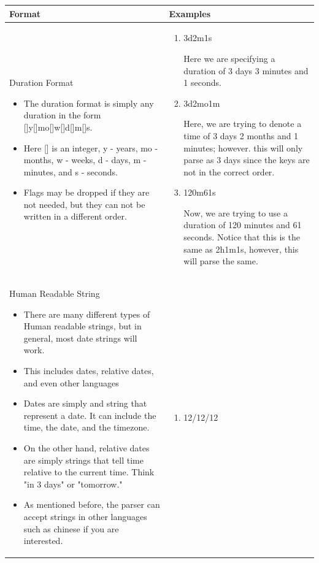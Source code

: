 \documentclass{scrartcl}
\begin{document}
\begin{tabularx}{\textwidth}{|>{\raggedright\arraybackslash}X|>{\raggedright\arraybackslash}X|}
\hline
Format & Examples \\
\hline
Duration Format

\begin{itemize}
    \item The duration format is simply any duration in the form []y[]mo[]w[]d[]m[]s.
    
    \item Here [] is an integer, y - years, mo - months, w - weeks, d - days, m - minutes, and s - seconds.
    
    \item Flags may be dropped if they are not needed, but they can not be written in a different order. 
    
\end{itemize}&
\begin{enumerate}
    \item 3d2m1s
    
    Here we are specifying a duration of 3 days 3 minutes and 1 seconds.
    
    \item 3d2mo1m
    
    Here, we are trying to denote a time of 3 days 2 months and 1 minutes; however. this will only parse as 3 days since the keys are not in the correct order. 
    
    \item 120m61s
    
    Now, we are trying to use a duration of 120 minutes and 61 seconds. Notice that this is the same as 2h1m1s, however, this will parse the same.
    
    
\end{enumerate}\\
\hline
Human Readable String 
\begin{itemize}
    \item There are many different types of Human readable strings, but in general, most date strings will work.
    \item This includes dates, relative dates, and even other languages
    \item Dates are simply and string that represent a date. It can include the time, the date, and the timezone. 
    \item On the other hand, relative dates are simply strings that tell time relative to the current time. Think "in 3 days" or "tomorrow."
    \item As mentioned before, the parser can accept strings in other languages such as chinese if you are interested. 
\end{itemize}& 
\begin{enumerate}
    \item 12/12/12
    

\end{enumerate}
\end{tabularx}
\end{document}
